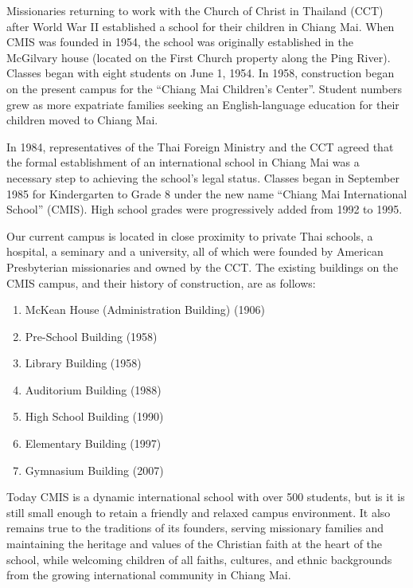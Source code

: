 
Missionaries returning to work with the Church of Christ in Thailand (CCT) after World War II established a school for their children in Chiang Mai.  When CMIS was founded in 1954, the school was originally established in the McGilvary house (located on the First Church property along the Ping River).  Classes began with eight students on June 1, 1954.  In 1958, construction began on the present campus for the “Chiang Mai Children’s Center”.   Student numbers grew as more expatriate families seeking an English-language education for their children moved to Chiang Mai.

In 1984, representatives of the Thai Foreign Ministry and the CCT agreed that the formal establishment of an international school in Chiang Mai was a necessary step to achieving the school’s legal status.  Classes began in September 1985 for Kindergarten to Grade 8 under the new name “Chiang Mai International School” (CMIS).  High school grades were progressively added from 1992 to 1995.  

Our current campus is located in close proximity to private Thai schools, a hospital, a seminary and a university, all of which were founded by American Presbyterian missionaries and owned by the CCT.  The existing buildings on the CMIS campus, and their history of construction, are as follows: 
\begin{enumerate}
\item McKean House (Administration Building) (1906)
\item Pre-School Building (1958)
\item Library Building (1958)
\item Auditorium Building (1988)
\item High School Building (1990)
\item Elementary Building (1997)
\item Gymnasium Building (2007)
\end{enumerate}
Today CMIS is a dynamic international school with over 500 students, but is it is still small enough to retain a friendly and relaxed campus environment.  It also remains true to the traditions of its founders, serving missionary families and maintaining the heritage and values of the Christian faith at the heart of the school, while welcoming children of all faiths, cultures, and ethnic backgrounds from the growing international community in Chiang Mai.  


